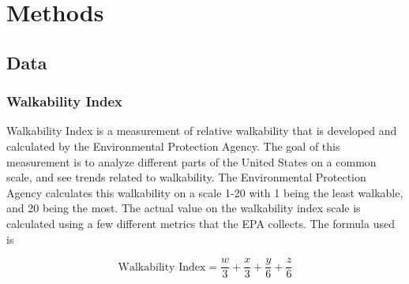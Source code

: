 \documentclass[
]{article}
\begin{document}
\section{Methods}\label{methods}

\subsection{Data}\label{data}

\subsubsection{Walkability Index}\label{walkability-index}

Walkability Index is a measurement of relative walkability that is
developed and calculated by the Environmental Protection Agency. The
goal of this measurement is to analyze different parts of the United
States on a common scale, and see trends related to walkability. The
Environmental Protection Agency calculates this walkability on a scale
1-20 with 1 being the least walkable, and 20 being the most. The actual
value on the walkability index scale is calculated using a few different
metrics that the EPA collects. The formula used is

\[\text{Walkability Index} = \frac{w}{3} + \frac{x}{3} +\frac{y}{6} + \frac{z}{6} \]
\end{document}
